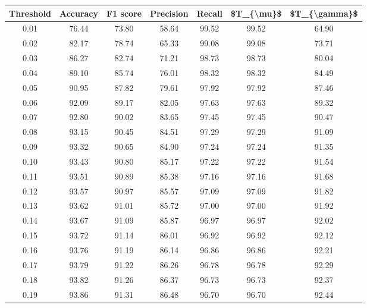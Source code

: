 \begin{tabular}{|c|c|c|c|c|c|c|}
\toprule
 Threshold &  Accuracy &  F1 score &  Precision &  Recall &  \$T\_\{\textbackslash mu\}\$ &  \$T\_\{\textbackslash gamma\}\$ \\
\hline
      0.01 &     76.44 &     73.80 &      58.64 &   99.52 &      99.52 &         64.90 \\
      0.02 &     82.17 &     78.74 &      65.33 &   99.08 &      99.08 &         73.71 \\
      0.03 &     86.27 &     82.74 &      71.21 &   98.73 &      98.73 &         80.04 \\
      0.04 &     89.10 &     85.74 &      76.01 &   98.32 &      98.32 &         84.49 \\
      0.05 &     90.95 &     87.82 &      79.61 &   97.92 &      97.92 &         87.46 \\
      0.06 &     92.09 &     89.17 &      82.05 &   97.63 &      97.63 &         89.32 \\
      0.07 &     92.80 &     90.02 &      83.65 &   97.45 &      97.45 &         90.47 \\
      0.08 &     93.15 &     90.45 &      84.51 &   97.29 &      97.29 &         91.09 \\
      0.09 &     93.32 &     90.65 &      84.90 &   97.24 &      97.24 &         91.35 \\
      0.10 &     93.43 &     90.80 &      85.17 &   97.22 &      97.22 &         91.54 \\
      0.11 &     93.51 &     90.89 &      85.38 &   97.16 &      97.16 &         91.68 \\
      0.12 &     93.57 &     90.97 &      85.57 &   97.09 &      97.09 &         91.82 \\
      0.13 &     93.62 &     91.01 &      85.72 &   97.00 &      97.00 &         91.92 \\
      0.14 &     93.67 &     91.09 &      85.87 &   96.97 &      96.97 &         92.02 \\
      0.15 &     93.72 &     91.14 &      86.01 &   96.92 &      96.92 &         92.12 \\
      0.16 &     93.76 &     91.19 &      86.14 &   96.86 &      96.86 &         92.21 \\
      0.17 &     93.79 &     91.22 &      86.26 &   96.78 &      96.78 &         92.29 \\
      0.18 &     93.82 &     91.26 &      86.37 &   96.73 &      96.73 &         92.37 \\
      0.19 &     93.86 &     91.31 &      86.48 &   96.70 &      96.70 &         92.44 \\

\end{tabular}
